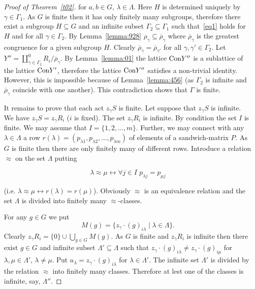 \documentclass{birkau}
\numberwithin{equation}{section}
\theoremstyle{plain}
\theoremstyle{definition}
\begin{document}
\begin{proof}[Proof of Theorem~\ref{t02}]
        for $a,b\in G$, $\lambda \in \Lambda$. Here $H$ is determined uniquely by $\gamma \in \Gamma_1$. As $G$ is finite then it has only finitely many subgroups, therefore there exist a subgroup $H \subseteq G$ and an infinite subset $\Gamma_2 \subseteq \Gamma_1$ such that~\eqref{eq1} holds for $H$ and for all $\gamma \in \Gamma_2$. By Lemma~\ref{lemma:928} $\rho_\gamma \subseteq \overline \rho_\gamma$ where $\overline \rho_\gamma$ is the greatest congruence for a given subgroup $H$. Clearly $\overline \rho_\gamma = \overline\rho_{\gamma'}$ for all $\gamma, \gamma' \in \Gamma_2$. Let $Y''= \coprod_{\gamma \in \Gamma_2}^0 R_i/{\overline \rho_\gamma}$. By Lemma~\ref{lemma:01} the lattice ${\rm Con}Y''$ is a sublattice of the lattice ${\rm Con}Y'$, therefore the lattice ${\rm Con}Y''$ satisfies a non-trivial identity. However, this is impossible because of Lemma~\ref{lemma:456} (as $\Gamma_2$ is infinite and $\overline\rho_\gamma$ coincide with one another). This contradiction shows that $\Gamma$ is finite.

        It remains to prove that each act $z_\gamma S$ is finite. Let suppose that $z_\gamma S$ is infinite. We have $z_\gamma S = z_\gamma R_i$ ($i$ is fixed). The set $z_\gamma R_i$ is infinite. By condition the set $I$ is finite. We may assume that $I=\{ 1,2, \ldots, m\}$. Further, we may connect with any $\lambda \in \Lambda$ a row $r(\lambda) = (p_{\lambda 1}, p_{\lambda 2}, \ldots, p_{\lambda m})$ of elements of a sandwich-matrix $P$. As $G$ is finite then there are only finitely many of different rows. Introduce a relation $\approx$ on the set $\Lambda$ putting

        $$ \lambda \approx \mu \leftrightarrow \forall j\in I \,\, p_{\lambda j} = p_{\mu j} $$

        (i.e. $\lambda \approx \mu \leftrightarrow r(\lambda) = r(\mu)$). Obviously $\approx$ is an equivalence relation and the set $\Lambda$ is divided into finitely many ${\approx}$-classes.

        For any $g \in G$ we put $$ M(g)= \{ z_\gamma \cdot (g)_{i\lambda} \mid \lambda \in \Lambda \}.  $$ Clearly $z_\gamma R_i = \{0\} \cup \bigcup_{g\in G} M(g)$. As $G$ is finite and $z_\gamma R_i$ is infinite then there exist $g\in G$ and infinite subset $\Lambda' \subseteq \Lambda$ such that $z_\gamma \cdot (g)_{ i \lambda } \ne z_\gamma \cdot (g)_{ i \mu}$ for $\lambda, \mu \in \Lambda'$, $\lambda \ne \mu$. Put $u_\lambda=z_\gamma \cdot (g)_{i\lambda}$ for $\lambda \in \Lambda'$. The infinite set $\Lambda'$ is divided by the relation $\approx$ into finitely many classes. Therefore at lest one of the classes is infinite, say, $\Lambda''$.


\end{proof}
\end{document}
